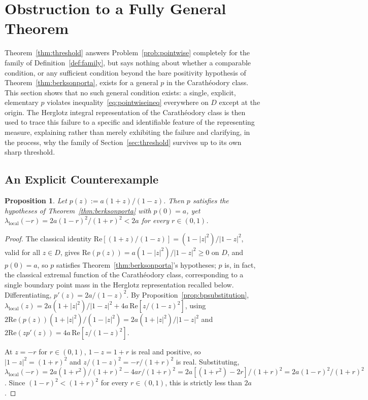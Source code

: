 \documentclass[pdflatex,sn-mathphys-num]{sn-jnl}%
\theoremstyle{thmstyleone}%
\newtheorem{proposition}[theorem]{Proposition}%
\theoremstyle{thmstyletwo}%
\theoremstyle{thmstylethree}%
\begin{document}
\section{Obstruction to a Fully General Theorem}
\label{sec:obstruction}

Theorem~\ref{thm:threshold} answers Problem~\ref{prob:pointwise} completely for the family of Definition~\ref{def:family}, but says nothing about whether a comparable condition, or any sufficient condition beyond the bare positivity hypothesis of Theorem~\ref{thm:berksonporta}, exists for a general $p$ in the Carath\'eodory class. This section shows that no such general condition exists: a single, explicit, elementary $p$ violates inequality~\eqref{eq:pointwiseineq} everywhere on $D$ except at the origin. The Herglotz integral representation of the Carath\'eodory class is then used to trace this failure to a specific and identifiable feature of the representing measure, explaining rather than merely exhibiting the failure and clarifying, in the process, why the family of Section~\ref{sec:threshold} survives up to its own sharp threshold.

\subsection{An Explicit Counterexample}

\begin{proposition}
\label{prop:extremalfails}
Let $p(z):=a(1+z)/(1-z)$. Then $p$ satisfies the hypotheses of Theorem~\ref{thm:berksonporta} with $p(0)=a$, yet $\lambda_{\mathrm{local}}(-r)=2a(1-r)^2/(1+r)^2<2a$ for every $r\in(0,1)$.
\end{proposition}

\begin{proof}
The classical identity $\mathrm{Re}[(1+z)/(1-z)]=(1-|z|^2)/|1-z|^2$, valid for all $z\in D$, gives $\mathrm{Re}(p(z))=a(1-|z|^2)/|1-z|^2\ge0$ on $D$, and $p(0)=a$, so $p$ satisfies Theorem~\ref{thm:berksonporta}'s hypotheses; $p$ is, in fact, the classical extremal function of the Carath\'eodory class, corresponding to a single boundary point mass in the Herglotz representation recalled below. Differentiating, $p'(z)=2a/(1-z)^2$. By Proposition~\ref{prop:bpsubstitution}, $\lambda_{\mathrm{local}}(z)=2a(1+|z|^2)/|1-z|^2+4a\,\mathrm{Re}[z/(1-z)^2]$, using $2\mathrm{Re}(p(z))(1+|z|^2)/(1-|z|^2)=2a(1+|z|^2)/|1-z|^2$ and $2\mathrm{Re}(zp'(z))=4a\,\mathrm{Re}[z/(1-z)^2]$.

At $z=-r$ for $r\in(0,1)$, $1-z=1+r$ is real and positive, so $|1-z|^2=(1+r)^2$ and $z/(1-z)^2=-r/(1+r)^2$ is real. Substituting, $\lambda_{\mathrm{local}}(-r)=2a(1+r^2)/(1+r)^2-4ar/(1+r)^2=2a[(1+r^2)-2r]/(1+r)^2=2a(1-r)^2/(1+r)^2$. Since $(1-r)^2<(1+r)^2$ for every $r\in(0,1)$, this is strictly less than $2a$.
\end{proof}
\end{document}
